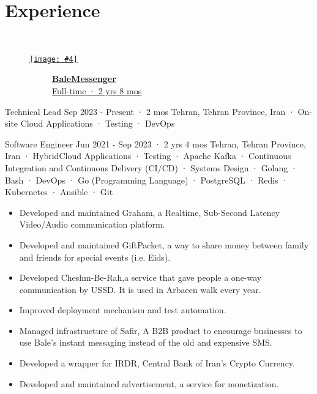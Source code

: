 \documentclass[a4paper,20pt]{article}
\newcommand{\companyHeadingWithImage}[4]{
    \vspace{-24pt}
    \begin{figure}[H]
        \href{#2}{\texttt{[image: \#4]}}
        \vspace{-37.5pt}
    \end{figure}
    ~~~~~~~~~~~\textbf{\href{#2}{#1}} \\
    ~~~~~~~~~~~\href{#2}{#3}
    \vspace{6pt}
}
\newcounter{mylist} %
\newenvironment{myitemize}{%
  \stepcounter{mylist}%
  \begin{itemize}
}{\end{itemize}%
  }
\begin{document}
\section{Experience}\
    \companyHeadingWithImage{BaleMessenger}{https://www.linkedin.com/company/balemessenger}{Full-time · 2 yrs 8 mos}{bale}
    \begin{myitemize}
        \begin{newexperience}                
            {Technical Lead}
            {Sep 2023 - Present · 2 mos}
            {Tehran, Tehran Province, Iran · On-site}
            {Cloud Applications · Testing · DevOps}
        \end{newexperience}

        \begin{newexperiencewithdesc}
            {Software Engineer}
            {Jun 2021 - Sep 2023 · 2 yrs 4 mos}
            {Tehran, Tehran Province, Iran · Hybrid}{Cloud Applications · Testing · Apache Kafka · Continuous Integration and Continuous Delivery (CI/CD) · Systems Design · Golang · Bash · DevOps · Go (Programming Language) · PostgreSQL · Redis · Kubernetes · Ansible · Git}
            {
                \begin{itemize}
                    \item Developed and maintained Graham, a Realtime, Sub-Second Latency Video/Audio communication platform.
                    \item Developed and maintained GiftPacket, a way to share money between family and friends for special events (i.e. Eids).
                    \item Developed Cheshm-Be-Rah,a service that gave people a one-way communication by USSD. It is used in Arbaeen walk every year.
                    \item Improved deployment mechanism and test automation.
                    \item Managed infrastructure of Safir, A B2B product to encourage 
                    businesses to use Bale's instant messaging instead of the old and 
                    expensive SMS.
                    \item Developed a wrapper for IRDR, Central Bank of Iran's Crypto Currency.
                    \item Developed and maintained advertisement, a service for monetization.
                \end{itemize}
            }
        \end{newexperiencewithdesc}


\end{myitemize}
\end{document}
